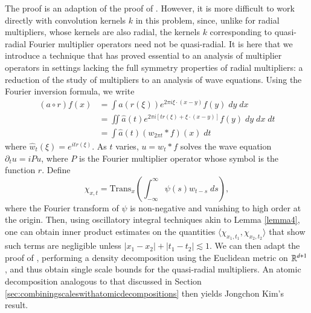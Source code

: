 The proof is an adaption of the proof of \cite{HeoandNazarovandSeeger}. However, it is more difficult to work directly with convolution kernels $k$ in this problem, since, unlike for radial multipliers, whose kernels are also radial, the kernels $k$ corresponding to quasi-radial Fourier multiplier operators need not be quasi-radial. It is here that we introduce a technique that has proved essential to an analysis of multiplier operators in settings lacking the full symmetry properties of radial multipliers: a reduction of the study of multipliers to an analysis of wave equations. Using the Fourier inversion formula, we write
%
\begin{equation}
\begin{split}
  (a \circ r) f(x) &= \int a(r(\xi)) e^{2 \pi i \xi \cdot (x - y)} f(y)\; dy\; dx\\
  &= \iint \widehat{a}(t) e^{2 \pi i [t r(\xi) + \xi \cdot (x - y)]} f(y)\; dy\; dx\; dt\\
  &= \int \widehat{a}(t) (w_{2 \pi t} * f)(x)\; dt
\end{split}
\end{equation}
%
where $\widehat{w}_t(\xi) = e^{i t r(\xi)}$. As $t$ varies, $u = w_t * f$ solves the wave equation $\partial_t u = i P u$, where $P$ is the Fourier multiplier operator whose symbol is the function $r$. Define
%
\begin{equation}
  \chi_{x,t} = \text{Trans}_x \left( \int_{-\infty}^\infty \psi(s) w_{t - s}\; ds \right),
\end{equation}
%
where the Fourier transform of $\psi$ is non-negative and vanishing to high order at the origin. Then, using oscillatory integral techniques akin to Lemma \ref{lemma4}, one can obtain inner product estimates on the quantities $\langle \chi_{x_1,t_1}, \chi_{x_2,t_2} \rangle$ that show such terms are negligible unless $|x_1 - x_2| + |t_1 - t_2| \lesssim 1$. We can then adapt the proof of \cite{HeoandNazarovandSeeger}, performing a density decomposition using the Euclidean metric on $\operatorname{\mathbb{R}}^{d+1}$, and thus obtain single scale bounds for the quasi-radial multipliers. An atomic decomposition analogous to that discussed in Section \ref{sec:combiningscaleswithatomicdecompositions} then yields Jongchon Kim's result.


